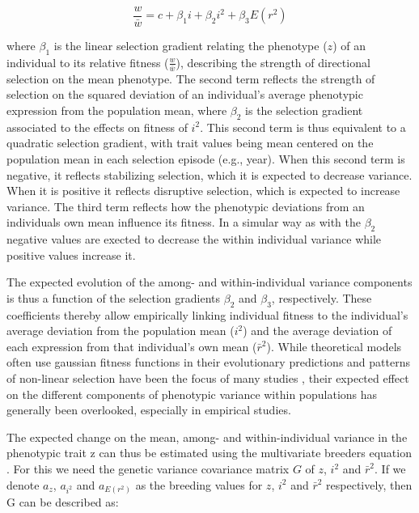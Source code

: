 \documentclass{article}
\begin{document}
\begin{equation} \label{eq:Breeders1}
\frac{w}{\bar{w}} = c + \beta_1 i + \beta_2 i^2  + \beta_{3} E(r^2)	
\end{equation}

where $\beta_1$ is the linear selection gradient relating the phenotype ($z$) of an individual to its relative fitness ($\frac{w}{\bar{w}}$), describing the strength of directional selection on the mean phenotype. The second term reflects the strength of selection on the squared deviation of an individual’s average phenotypic expression from the population mean, where $\beta_2$ is the selection gradient associated to the effects on fitness of $i^2$. This second term is thus equivalent to a quadratic selection gradient, with trait values being mean centered on the population mean in each selection episode (e.g., year). When this second term is negative, it reflects stabilizing selection, which it is expected to decrease variance. When it is positive it reflects disruptive selection, which is expected to increase variance. The third term reflects how the phenotypic deviations from an individuals own mean influence its fitness. In a simular way as with the $\beta_{2}$ negative values are exected to decrease the within individual variance while positive values increase it.

The expected evolution of the among- and within-individual variance components is thus a function of the selection gradients $\beta_2$ and $\beta_3$, respectively. These coefficients thereby allow empirically linking individual fitness to the individual’s average deviation from the population mean ($i^2$) and the average deviation of each expression from that individual’s own mean ($\bar{r}^2$). While theoretical models often use gaussian fitness functions in their evolutionary predictions and patterns of non-linear selection have been the focus of many studies \citep{Kingsolver2001}, their expected effect on the different components of phenotypic variance within populations has generally been overlooked, especially in empirical studies.  

The expected change on the mean, among- and within-individual variance in the phenotypic trait z can thus be estimated using the multivariate breeders equation \citep{Lande1983}. For this we need the genetic variance covariance matrix $G$ of $z$, $i^2$ and $\bar{r}^2$. If we denote $a_z$, $a_{i^2}$ and $a_{E(r^2)}$ as the breeding values for $z$, $i^2$ and $\bar{r}^2$ respectively, then G can be described as:
\end{document}
